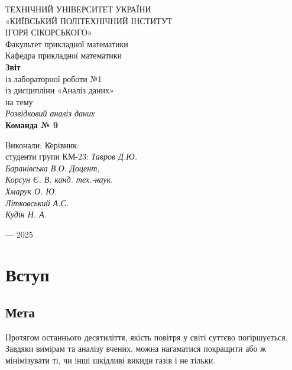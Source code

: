 \documentclass{article}
\begin{document}
\newpage 
\begin{center}
     ТЕХНІЧНИЙ УНІВЕРСИТЕТ УКРАЇНИ\\
    \Large«КИЇВСЬКИЙ ПОЛІТЕХНІЧНИЙ ІНСТИТУТ\\
     ІГОРЯ СІКОРСЬКОГО»\\
    \vspace{1cm}
    Факультет прикладної математики\\
    Кафедра прикладної математики\\
    \vspace{3cm}
    \textbf{Звіт}\\
    \vspace{0.5cm}
    із лабораторної роботи №1\\
    із дисципліни «Аналіз даних»\\
    \vspace{1cm}
    на тему\\
    \textit{Розвідковий аналіз даних}\\
    \vspace{1.5cm}
    \textbf{Команда № 9}\\
    \vspace{2cm}
    \begin{tabbing}
        Виконали: \hspace{10cm} \= Керівник:\\
        студенти групи КМ-23: \> \textit{Тавров Д.Ю.}\\
        \textit{Баранівська В.О.} \> \textit{Доцент,}\\
        \textit{Корсун Є. В.} \> \textit{канд. тех.-наук}.\\
        \textit{Хмарук О. Ю.} \> \\
        \textit{Літковський А.С.} \>\\
        \textit{Кудін Н. А.} \> \\
    \end{tabbing}
    \vspace{3cm}
     — 2025\\
\end{center}

\newpage
\hypertarget{mytarget}{} %
\tableofcontents
\newpage

\section{Вступ}
\subsection{Мета}
Протягом останнього десятиліття, якість повітря у світі суттєво погіршується. Завдяки вимірам та аналізу вчених, можна нагаматися покращити або ж мінімізувати ті, чи інші шкідливі викиди газів і не тільки. 
\end{document}
